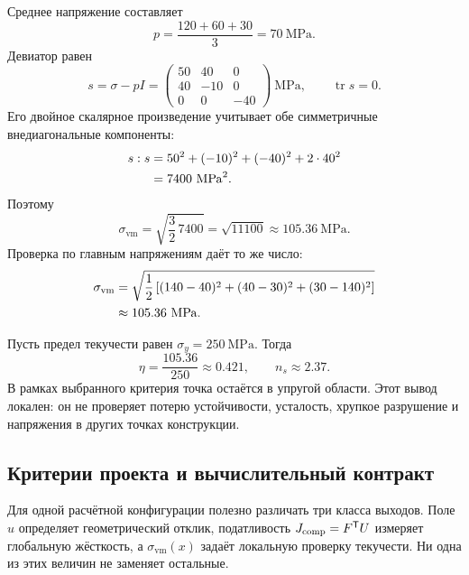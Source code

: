 Среднее напряжение составляет
\begin{equation}
\label{eq:worked-mean-stress-v05}
 p
 =\frac{120+60+30}{3}
 =70\ \mathrm{MPa}.
\end{equation}
Девиатор равен
\begin{equation}
\label{eq:worked-deviator-v05}
 s
 =\sigma-pI
 =
 \begin{pmatrix}
 50&40&0\\
 40&-10&0\\
 0&0&-40
 \end{pmatrix}
 \ \mathrm{MPa},
 \qquad
 \operatorname{tr}s=0.
\end{equation}
Его двойное скалярное произведение учитывает обе симметричные внедиагональные компоненты:
\begin{align}
 s:s
 &=50^2+(-10)^2+(-40)^2+2\cdot40^2
 \notag\\
 &=7400\ \mathrm{MPa}^2.
 \label{eq:worked-deviator-norm-v05}
\end{align}
Поэтому
\begin{equation}
\label{eq:worked-von-mises-v05}
 \sigma_{\mathrm{vm}}
 =\sqrt{\frac32\,7400}
 =\sqrt{11100}
 \approx105.36\ \mathrm{MPa}.
\end{equation}
Проверка по главным напряжениям даёт то же число:
\begin{align}
 \sigma_{\mathrm{vm}}
 &=\sqrt{\frac12\left[
 (140-40)^2+(40-30)^2+(30-140)^2
 \right]}
 \notag\\
 &\approx105.36\ \mathrm{MPa}.
 \label{eq:worked-von-mises-principal-check-v05}
\end{align}

Пусть предел текучести равен $\sigma_y=250\ \mathrm{MPa}$. Тогда
\begin{equation}
\label{eq:worked-utilization-v05}
 \eta
 =\frac{105.36}{250}
 \approx0.421,
 \qquad
 n_s\approx2.37.
\end{equation}
В рамках выбранного критерия точка остаётся в упругой области. Этот вывод локален: он не проверяет потерю устойчивости, усталость, хрупкое разрушение и напряжения в других точках конструкции.

\subsection{Критерии проекта и вычислительный контракт}

Для одной расчётной конфигурации полезно различать три класса выходов. Поле $u$ определяет геометрический отклик, податливость $J_{\mathrm{comp}}=F^{\mathsf{T}}U$ измеряет глобальную жёсткость, а $\sigma_{\mathrm{vm}}(x)$ задаёт локальную проверку текучести. Ни одна из этих величин не заменяет остальные.

